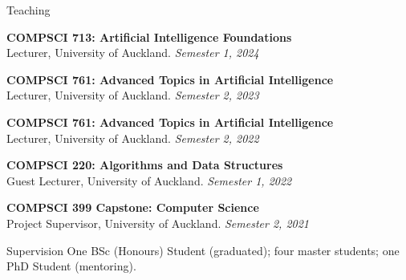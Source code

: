 \documentclass{resume} %
\begin{document}
\begin{rSection}{Teaching}
	\begin{rSubsection}{}{}{}{}
	\item {\bf COMPSCI 713: Artificial Intelligence Foundations}\\ Lecturer, University of Auckland. \hfill {\em Semester 1, 2024}
	\item {\bf COMPSCI 761: Advanced Topics in Artificial Intelligence}\\ Lecturer, University of Auckland. \hfill {\em Semester 2, 2023}
	\item {\bf COMPSCI 761: Advanced Topics in Artificial Intelligence}\\ Lecturer, University of Auckland. \hfill {\em Semester 2, 2022}
		\item {\bf COMPSCI 220: Algorithms and Data Structures}\\ Guest Lecturer, University of Auckland. \hfill {\em Semester 1, 2022} 
		\item {\bf COMPSCI 399 Capstone: Computer Science}\\ Project Supervisor, University of Auckland. \hfill {\em Semester 2, 2021}
	\end{rSubsection}
\end{rSection}

\begin{rSection}{Supervision}
One BSc (Honours) Student (graduated); four master students; one PhD Student (mentoring).
\end{rSection}
\end{document}
